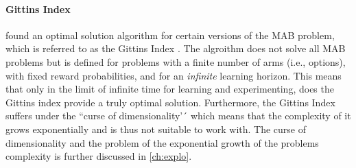 
\paragraph{Gittins Index}
\cite{gittins1979bandit} found an optimal solution algorithm for certain versions of the MAB problem, which is referred to as the Gittins Index \citep{gittins1979bandit}. The algroithm does not solve all MAB problems but is 
defined for problems with a finite number of arms (i.e., options), with fixed reward probabilities, and for an \textit{infinite} learning horizon.
This means that only in the limit of infinite time for learning and experimenting, does the Gittins index provide a truly optimal solution. Furthermore, the Gittins Index suffers under the ``curse of dimensionality'´ which means that the complexity of it grows exponentially and is thus not suitable to work with. The curse of dimensionality and the problem of the exponential growth of the problems complexity is further discussed in \ref{ch:explo}. 


